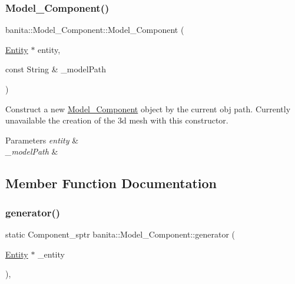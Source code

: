 \subsubsection{\texorpdfstring{Model\_Component()}{Model\_Component()}\hspace{0.1cm}{\footnotesize\ttfamily [2/2]}}
{\footnotesize\ttfamily banita\+::\+Model\+\_\+\+Component\+::\+Model\+\_\+\+Component (\begin{DoxyParamCaption}\item[{\mbox{\hyperlink{classbanita_1_1_entity}{Entity}} $\ast$}]{entity,  }\item[{const String \&}]{\+\_\+model\+Path }\end{DoxyParamCaption})}



Construct a new \mbox{\hyperlink{classbanita_1_1_model___component}{Model\+\_\+\+Component}} object by the current obj path. Currently unavailable the creation of the 3d mesh with this constructor. 


\begin{DoxyParams}{Parameters}
{\em entity} & \\
\hline
{\em \+\_\+model\+Path} & \\
\hline
\end{DoxyParams}


\subsection{Member Function Documentation}
\mbox{\label{classbanita_1_1_model___component_a4a5d4212e321577342bc1a8f4c997ca9}} 
\subsubsection{\texorpdfstring{generator()}{generator()}}
{\footnotesize\ttfamily static Component\+\_\+sptr banita\+::\+Model\+\_\+\+Component\+::generator (\begin{DoxyParamCaption}\item[{\mbox{\hyperlink{classbanita_1_1_entity}{Entity}} $\ast$}]{\+\_\+entity }\end{DoxyParamCaption})\hspace{0.3cm}{\ttfamily [inline]}, {\ttfamily [static]}}



